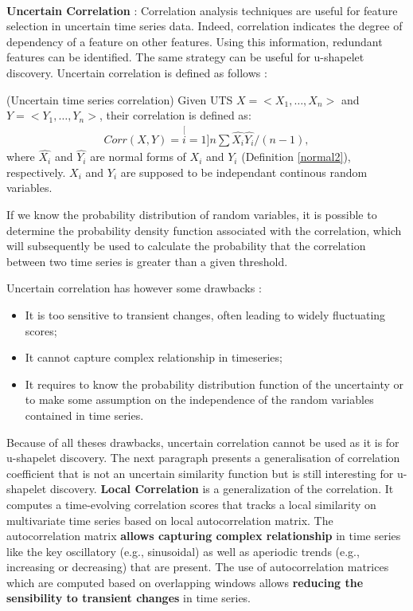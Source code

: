 \\
\textbf{Uncertain Correlation} \cite{Orang2017}: 
Correlation analysis techniques are useful for feature selection in uncertain time series data. Indeed, correlation indicates the degree of dependency of a feature on other features. Using this information, redundant features can be identified. The same strategy can be useful for  u-shapelet discovery.  Uncertain
correlation is defined as follows : 


\begin{definition}
(Uncertain time series correlation) Given UTS  $X = <X_1, \ldots, X_n>$ and  $Y = <Y_1, \ldots, Y_n>$, their correlation is defined as:
\begin{eqnarray}
Corr(X,Y)=\stackrel[i=1]{n}{\sum}\hat{X_{i}}\hat{Y_{i}}/(n-1),
\end{eqnarray}
where $\hat{X_{i}}$ and
$\hat{Y_{i}}$ are normal forms of $X_i$ and $Y_i$ (Definition \ref{normal2}), respectively. $X_i$ and $Y_i$ are supposed to be independant continous random variables.
\end{definition}
If we know the probability distribution of random variables, it is possible to determine the probability density function associated with the correlation, which will subsequently be used to calculate the probability that the correlation between two time series is greater than a given threshold.   


Uncertain correlation has however some drawbacks :
\begin{itemize}
\item It is too sensitive to transient changes, often leading to widely fluctuating scores;
\item It cannot capture complex relationship in timeseries;
\item It requires to know the probability distribution function of the uncertainty or to make some assumption on the independence of the random variables  contained in time series.

\end{itemize}
Because of all theses drawbacks, uncertain correlation cannot be used as it is for u-shapelet discovery. The next paragraph presents a generalisation of correlation coefficient that is not an uncertain similarity function but is still interesting for u-shapelet discovery.
\textbf{Local Correlation} \cite{papadimitriou2006local} is a
generalization of the correlation. It computes a time-evolving correlation scores that tracks a local similarity on multivariate time series based on local autocorrelation matrix. The autocorrelation matrix \textbf{allows capturing complex relationship} in time series like the key oscillatory (e.g., sinusoidal) as well as aperiodic trends (e.g., increasing or decreasing)  that are present. The use of  autocorrelation
matrices which are computed based on overlapping windows allows \textbf{reducing the sensibility to transient changes} in time series.


